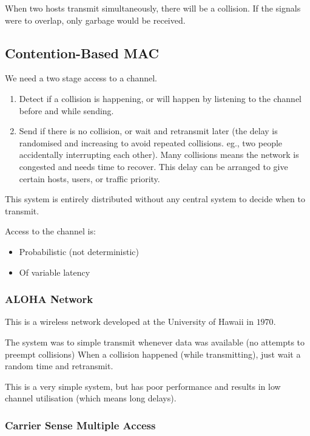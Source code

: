 When two hosts transmit simultaneously, there will be a collision.
If the signals were to overlap, only garbage would be received.

\subsection{Contention-Based MAC}\label{sub:contention_based_mac}

We need a two stage access to a channel.
\begin{enumerate}
    \item Detect if a collision is happening, or will happen by listening to the channel before and while sending.
    \item Send if there is no collision, or wait and retransmit later (the delay is randomised and increasing to avoid repeated collisions. eg., two people accidentally interrupting each other).
          Many collisions means the network is congested and needs time to recover.
          This delay can be arranged to give certain hosts, users, or traffic priority.
\end{enumerate}

\begin{note}
    This system is entirely distributed without any central  system to decide when to transmit.
\end{note}
\noindent
Access to the channel is:
\begin{itemize}
    \item Probabilistic (not deterministic)
    \item Of variable latency
\end{itemize}

\subsubsection{ALOHA Network}\label{ssub:aloha_network}

This is a wireless network developed at the University of Hawaii in \(1970\).

The system was to simple transmit whenever data was available (no attempts to preempt collisions)
When a collision happened (while transmitting), just wait a random time and retransmit.

This is a very simple system, but has poor performance and results in low channel utilisation (which means long delays).

\subsubsection{Carrier Sense Multiple Access}\label{ssub:carrier_sense_multiple_access}

